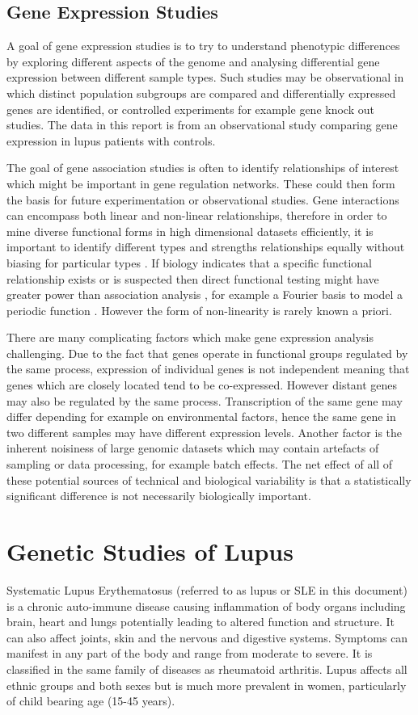 \documentclass[a4paper, 12pt]{report}
\begin{document}
\subsection*{Gene Expression Studies}
A goal of gene expression studies is to try to understand phenotypic differences by exploring different aspects of the genome and analysing differential gene expression between different sample types. Such studies may be observational in which distinct population subgroups are compared and differentially expressed genes are identified, or controlled experiments for example gene knock out studies. The data in this report is from an observational study comparing gene expression in lupus patients with controls.

The goal of gene association studies is often to identify relationships of interest which might be important in gene regulation networks. These could then form the basis for future experimentation or observational studies. Gene interactions can encompass both linear and non-linear relationships, therefore in order to mine diverse functional forms in high dimensional datasets efficiently, it is important to identify different types and strengths relationships equally without biasing for particular types \cite{BayesianGRN}. If biology indicates that a specific functional relationship exists or is suspected then direct functional testing might have greater power than association analysis \cite{bigdata2012}, for example a Fourier basis to model a periodic function \cite{BayesianGRN}. However the form of non-linearity is rarely known a priori. 

There are many complicating factors which make gene expression analysis challenging. Due to the fact that genes operate in functional groups regulated by the same process, expression of individual genes is not independent meaning that genes which are closely located tend to be co-expressed. However distant genes may also be regulated by the same process. Transcription of the same gene may differ depending for example on environmental factors, hence the same gene in two different samples may have different expression levels.  Another factor is the inherent noisiness of large genomic datasets which may contain artefacts of sampling or data processing, for example batch effects. The net effect of all of these potential sources of technical and biological variability is that a statistically significant difference is not necessarily biologically important.

\section{Genetic Studies of Lupus}
Systematic Lupus Erythematosus (referred to as lupus or \gls{SLE} in this document) is a chronic auto-immune disease causing inflammation of body organs including brain, heart and  lungs potentially leading to altered function and structure. It can also affect joints, skin and the nervous and digestive systems. Symptoms can manifest in any part of the body and range from moderate to severe.  It is classified in the same family of diseases as rheumatoid arthritis. Lupus affects all ethnic groups and both sexes but is much more prevalent in women, particularly of child bearing age (15-45 years). 
\end{document}
